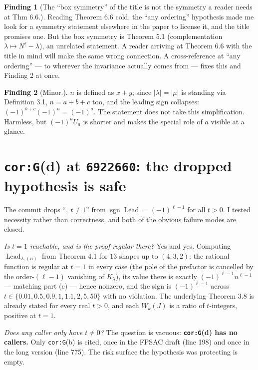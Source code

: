 \documentclass[11pt]{article}
\theoremstyle{definition}
\newtheorem{finding}{Finding}
\newcommand{\Lead}{\operatorname{Lead}}
\begin{document}
\begin{finding}[The ``box symmetry'' of the title is not the symmetry a reader needs at Thm 6.6.]
Reading Theorem 6.6 cold, the ``any ordering'' hypothesis made me look for a symmetry statement
elsewhere in the paper to license it, and the title promises one. But the box symmetry is
Theorem 5.1 (complementation $\lambda\mapsto N^\ell-\lambda$), an unrelated statement. A reader
arriving at Theorem 6.6 with the title in mind will make the same wrong connection. A
cross-reference at ``any ordering'' --- to wherever the invariance actually comes from --- fixes
this and Finding 2 at once.
\end{finding}

\begin{finding}[Minor.]
$n$ is defined as $x+y$; since $|\lambda|=|\mu|$ is standing via Definition 3.1,
$n=a+b+c$ too, and the leading sign collapses:
$(-1)^{b+c}(-1)^n=(-1)^a$. The statement does not take this simplification. Harmless, but
$(-1)^aU_a$ is shorter and makes the special role of $a$ visible at a glance.
\end{finding}

\section{\texttt{cor:G}(d) at \texttt{6922660}: the dropped hypothesis is safe}

The commit drops ``$,\ t\neq1$'' from $\operatorname{sgn}\Lead=(-1)^{\ell-1}$ for all $t>0$.
I tested necessity rather than correctness, and both of the obvious failure modes are closed.

\emph{Is $t=1$ reachable, and is the proof regular there?} Yes and yes. Computing
$\Lead_{\lambda,(n)}$ from Theorem 4.1 for $13$ shapes up to $(4,3,2)$: the rational function is
regular at $t=1$ in every case (the pole of the prefactor is cancelled by the order-$(\ell-1)$
vanishing of $K_\lambda$), its value there is exactly $(-1)^{\ell-1}n^{\ell-1}$ --- matching
part (c) --- hence nonzero, and the sign is $(-1)^{\ell-1}$ across
$t\in\{0.01,0.5,0.9,1,1.1,2,5,50\}$ with no violation. The underlying Theorem 3.8 is already
stated for every real $t>0$, and each $W_k(J)$ is a ratio of $t$-integers, positive at $t=1$.

\emph{Does any caller only have $t\neq0$?} The question is vacuous: \textbf{\texttt{cor:G}(d)
has no callers.} Only \texttt{cor:G}(b) is cited, once in the FPSAC draft (line 198) and once in
the long version (line 775). The risk surface the hypothesis was protecting is empty.
\end{document}
